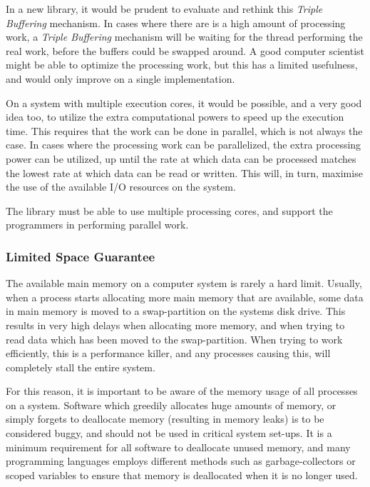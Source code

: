 \documentclass[a4paper]{article}
\begin{document}
In a new library, it would be prudent to evaluate and rethink this \textit{Triple Buffering} mechanism. In cases where there are is a high amount of processing work, a \textit{Triple Buffering} mechanism will be waiting for the thread performing the real work, before the buffers could be swapped around. A good computer scientist might be able to optimize the processing work, but this has a limited usefulness, and would only improve on a single implementation.

On a system with multiple execution cores, it would be possible, and a very good idea too, to utilize the extra computational powers to speed up the execution time. This requires that the work can be done in parallel, which is not always the case. In cases where the processing work can be parallelized, the extra processing power can be utilized, up until the rate at which data can be processed matches the lowest rate at which data can be read or written. This will, in turn, maximise the use of the available I/O resources on the system.

The library must be able to use multiple processing cores, and support the programmers in performing parallel work.


\subsubsection{Limited Space Guarantee}
The available main memory  on a computer system is rarely a hard limit. Usually, when a process starts allocating more main memory that are available, some data in main memory is moved to a swap-partition on the systems disk drive. This results in very high delays when allocating more memory, and when trying to read data which has been moved to the swap-partition. When trying to work efficiently, this is a performance killer, and any processes causing this, will completely stall the entire system. 

For this reason, it is important to be aware of the memory usage of all processes on a system. Software which greedily allocates huge amounts of memory, or simply forgets to deallocate memory (resulting in memory leaks) is to be considered buggy, and should not be used in critical system set-ups. It is a minimum requirement for all software to deallocate unused memory, and many programming languages employs different methods such as garbage-collectors or scoped variables to ensure that memory is deallocated when it is no longer used.\\
\end{document}
